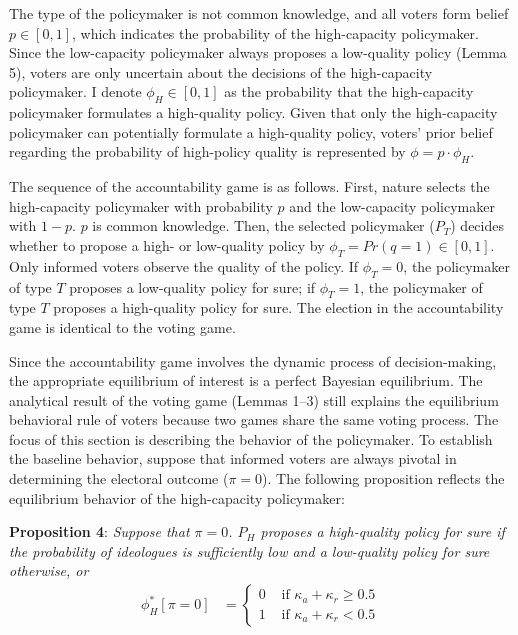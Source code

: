 \documentclass[letterpaper, 12pt]{article}
\begin{document}
    \par The type of the policymaker is not common knowledge, and all voters form belief $p \in [0, 1]$, which indicates the probability of the high-capacity policymaker. Since the low-capacity policymaker always proposes a low-quality policy (Lemma 5), voters are only uncertain about the decisions of the high-capacity policymaker. I denote $\phi_H \in [0,1]$ as the probability that the high-capacity policymaker formulates a high-quality policy. Given that only the high-capacity policymaker can potentially formulate a high-quality policy, voters' prior belief regarding the probability of high-policy quality is represented by $\phi = p \cdot \phi_H$. 
    
    \par The sequence of the accountability game is as follows. First, nature selects the high-capacity policymaker with probability $p$ and the low-capacity policymaker with $1-p$. $p$ is common knowledge. Then, the selected policymaker ($P_T$) decides whether to propose a high- or low-quality policy by $\phi_T = Pr(q=1) \in [0, 1]$. Only informed voters observe the quality of the policy. If $\phi_T = 0$, the policymaker of type $T$ proposes a low-quality policy for sure; if $\phi_T = 1$, the policymaker of type $T$ proposes a high-quality policy for sure. The election in the accountability game is identical to the voting game. 
    
    \par Since the accountability game involves the dynamic process of decision-making, the appropriate equilibrium of interest is a perfect Bayesian equilibrium. The analytical result of the voting game (Lemmas 1--3) still explains the equilibrium behavioral rule of voters because two games share the same voting process. The focus of this section is describing the behavior of the policymaker. To establish the baseline behavior, suppose that informed voters are always pivotal in determining the electoral outcome ($\pi=0$). The following proposition reflects the equilibrium behavior of the high-capacity policymaker:
    
    \noindent \textbf{Proposition 4}: \textit{Suppose that $\pi=0$. $P_H$ proposes a high-quality policy for sure if the probability of ideologues is sufficiently low and a low-quality policy for sure otherwise, or}
    \begin{align}
    \phi^*_H[\pi=0] &=
    \begin{cases}
    0 &\text{ if }  \kappa_{a} + \kappa_{r} \geq 0.5 \\
    1 &\text{ if }  \kappa_{a} + \kappa_{r} < 0.5
    \end{cases}
    \end{align}
    
\end{document}
